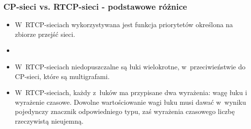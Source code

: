 \documentclass{beamer}
\begin{document}
\begin{frame}
{%
}


\end{frame}


\begin{frame}
\frametitle{CP-sieci vs. RTCP-sieci - podstawowe różnice}

\begin{itemize}
\setlength{\itemsep}{3mm}

\item<1-3>\alert<2>{W~RTCP-sieciach wykorzystywana jest funkcja priorytetów określona na zbiorze przejść sieci.}

\item<2,4>

\item<3-> W~RTCP-sieciach niedopuszczalne są łuki wielokrotne, w~przeciwieństwie do CP-sieci, które są multigrafami.

\item<-2> W~RTCP-sieciach, każdy z~łuków ma przypisane dwa wyrażenia: wagę łuku i wyrażenie czasowe. Dowolne wartościowanie wagi łuku musi dawać w~wyniku pojedynczy znacznik odpowiedniego typu, zaś wyrażenia czasowego liczbę rzeczywistą nieujemną. 


\end{itemize}



\end{frame}
\end{document}
